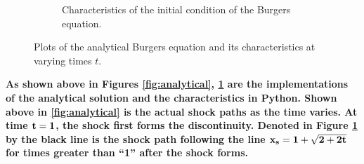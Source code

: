 \begin{adjustwidth}{2.5em}{0pt}
\begin{figure}[h]
\begin{subfigure}[b]{0.45\linewidth}
            \caption{Characteristics of the initial condition of the Burgers equation.}
            \label{fig:characteristics}
        \end{subfigure}
        \caption{Plots of the analytical Burgers equation and its characteristics at varying times $t$.}
        \label{fig:combined_analytical_characteristics}
    \end{figure}

    \begin{fminipage}{0.9\linewidth}
        \textbf{As shown above in Figures \ref{fig:analytical}, \ref{fig:characteristics} are the implementations of the analytical solution and the characteristics in Python. Shown above in \ref{fig:analytical} is the actual shock paths as the time varies. At time $\bf t=1$, the shock first forms the discontinuity. Denoted in Figure \ref{fig:characteristics} by the black line is the shock path following the line $\bf x_s = 1+\sqrt{2 + 2t}$ for times greater than ``1'' after the shock forms.}
    \end{fminipage}
\end{adjustwidth}


